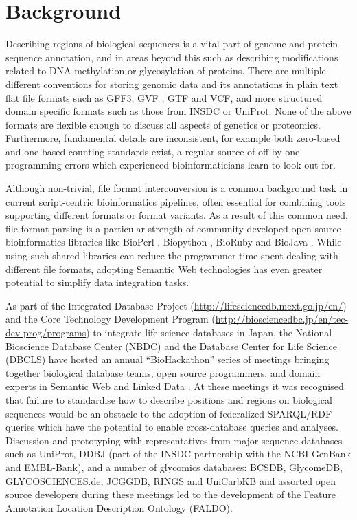 \section*{Background}
Describing regions of biological sequences is a vital part of genome and protein sequence
annotation, and in areas beyond this such as describing modifications related to DNA methylation
or glycosylation of proteins.
There are multiple different conventions for storing genomic data and its annotations in
plain text flat file formats such as GFF3, GVF \cite{GVF}, GTF and VCF,
and more structured domain specific formats such as those from INSDC or UniProt.
None of the above formats are flexible enough to discuss all aspects of genetics or proteomics. 
Furthermore, fundamental details are inconsistent, for example both zero-based and
one-based counting standards exist, a regular source of off-by-one programming
errors which experienced bioinformaticians learn to look out for.

Although non-trivial, file format interconversion is a common background task
in current script-centric bioinformatics pipelines, often essential for combining
tools supporting different formats or format variants. 
As a result of this common need, file format parsing is a particular strength of
community developed open source bioinformatics libraries like BioPerl
\cite{BioPerl2002}, Biopython \cite{Biopython2009}, BioRuby \cite{BioRuby2010}
and BioJava \cite{BioJava2012}. While using such shared libraries can reduce the
programmer time spent dealing with different file formats, adopting Semantic
Web technologies has even greater potential to simplify data integration tasks.

As part of the Integrated Database Project (\url{http://lifesciencedb.mext.go.jp/en/}) and
the Core Technology Development Program (\url{http://biosciencedbc.jp/en/tec-dev-prog/programs})
to integrate life science databases in Japan, the National Bioscience Database Center (NBDC) and the Database
Center for Life Science (DBCLS) have hosted an annual ``BioHackathon'' series
of meetings bringing together biological database teams, open source programmers,
and domain experts in Semantic Web and Linked Data \cite{BioHack2010,BioHack2011and2012}.
At these meetings it was recognised that failure to standardise how to describe positions
and regions on biological sequences would be an obstacle to the adoption of federalized
SPARQL/RDF queries which have the potential to enable cross-database queries and
analyses. Discussion and prototyping with representatives from major sequence databases
such as UniProt\cite{UniProt2013}, DDBJ\cite{DDBJ2013} (part of the INSDC partnership with the NCBI-GenBank\cite{GenBank2013} and EMBL-Bank\cite{ENA2013}),
and a number of glycomics databases: 
BCSDB\cite{doi:10.1021/ci100150d}, GlycomeDB\cite{Ranzinger01012011}, GLYCOSCIENCES.de\cite{Lutteke01052006}, JCGGDB, RINGS\cite{RINGS} and UniCarbKB\cite{UniCarbKB} and assorted open source developers during these meetings
led to the development of the Feature Annotation Location Description Ontology (FALDO).

